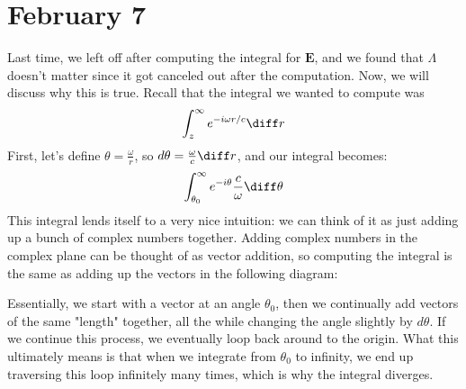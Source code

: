 \section{February 7}
Last time, we left off after computing the integral for \( \mathbf{E} \), and we found that \( \Lambda \)
doesn't matter since it got canceled out after the computation. Now, we will discuss why this is true.      
Recall that the integral we wanted to compute was
\[
	\int_{z}^{\infty} e^{-i \omega r / c }\diff r
\]
First, let's define \( \theta = \frac{\omega}{r} \), so \( d\theta = \frac{\omega}{c}\diff r \), and our
integral becomes:
\[
	\int_{\theta_0}^{\infty}e^{-i \theta} \frac{c}{\omega} \diff \theta
\]
This integral lends itself to a very nice intuition: we can think of it as just adding up a bunch of complex
numbers together. Adding complex numbers in the complex plane can be thought of as vector addition, so
computing the integral is the same as adding up the vectors in the following diagram:

\begin{center}
\end{center}

Essentially, we start with a vector at an angle \( \theta_0 \), then we continually add vectors of the same
"length" together, all the while changing the angle slightly by \( d\theta \). If we continue this process,
we eventually loop back around to the origin. What this ultimately means is that when we integrate from \(
\theta_0 \) to infinity, we end up traversing this loop infinitely many times, which is why the integral
diverges. 

